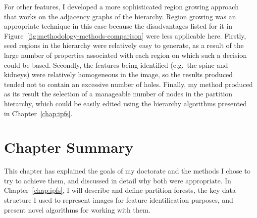 For other features, I developed a more sophisticated region growing approach that works on the adjacency graphs of the hierarchy. Region growing was an appropriate technique in this case because the disadvantages listed for it in Figure~\ref{fig:methodology-methods-comparison} were less applicable here. Firstly, seed regions in the hierarchy were relatively easy to generate, as a result of the large number of properties associated with each region on which such a decision could be based. Secondly, the features being identified (e.g.~the spine and kidneys) were relatively homogeneous in the image, so the results produced tended not to contain an excessive number of holes. Finally, my method produced as its result the selection of a manageable number of nodes in the partition hierarchy, which could be easily edited using the hierarchy algorithms presented in Chapter~\ref{chap:ipfs}.

\newpage

\section{Chapter Summary}

This chapter has explained the goals of my doctorate and the methods I chose to try to achieve them, and discussed in detail why both were appropriate. In Chapter~\ref{chap:ipfs}, I will describe and define partition forests, the key data structure I used to represent images for feature identification purposes, and present novel algorithms for working with them.
